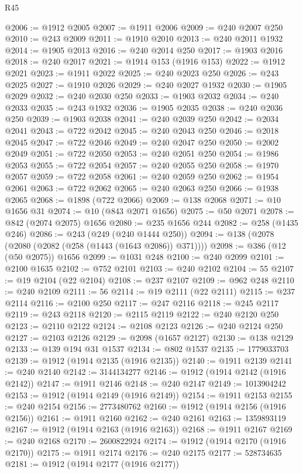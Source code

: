 \begin{lexlean}{R45}
\begin{coremodule}
{@2006 := @1912 @2005
@2007 := @1911 @2006
@2009 := @240 @2007 @250
@2010 := @243 @2009
@2011 := @1910 @2010
@2013 := @240 @2011 @1932
@2014 := @1905 @2013
@2016 := @240 @2014 @250
@2017 := @1903 @2016
@2018 := @240 @2017
@2021 := @1914 @153 (@1916 @153)
@2022 := @1912 @2021
@2023 := @1911 @2022
@2025 := @240 @2023 @250
@2026 := @243 @2025
@2027 := @1910 @2026
@2029 := @240 @2027 @1932
@2030 := @1905 @2029
@2032 := @240 @2030 @250
@2033 := @1903 @2032
@2034 := @240 @2033
@2035 := @243 @1932
@2036 := @1905 @2035
@2038 := @240 @2036 @250
@2039 := @1903 @2038
@2041 := @240 @2039 @250
@2042 := @2034 @2041
@2043 := @722 @2042
@2045 := @240 @2043 @250
@2046 := @2018 @2045
@2047 := @722 @2046
@2049 := @240 @2047 @250
@2050 := @2002 @2049
@2051 := @722 @2050
@2053 := @240 @2051 @250
@2054 := @1986 @2053
@2055 := @722 @2054
@2057 := @240 @2055 @250
@2058 := @1970 @2057
@2059 := @722 @2058
@2061 := @240 @2059 @250
@2062 := @1954 @2061
@2063 := @722 @2062
@2065 := @240 @2063 @250
@2066 := @1938 @2065
@2068 := @1898 (@722 @2066)
@2069 := @138 @2068
@2071 := @10 @1656 @31
@2074 := @10 (@843 @2071 @1656)
@2075 := @50 @2071
@2078 := @842 (@2074 @2075) @1656
@2080 := @235 @1656 @244
@2082 := @258 (@1435 @246)
@2086 := @243 (@249 (@240 @1444 @250))
@2094 := @138 (@2078 (@2080 (@2082 (@258 (@1443 (@1643 @2086)) @371))))
@2098 := @386 (@12 (@50 @2075)) @1656
@2099 := @1031 @248
@2100 := @240 @2099
@2101 := @2100 @1635
@2102 := @752 @2101
@2103 := @240 @2102
@2104 := 55
@2107 := @19 @2104 (@22 @2104)
@2108 := @237 @2107
@2109 := @962 @248
@2110 := @240 @2109
@2111 := 56
@2114 := @19 @2111 (@22 @2111)
@2115 := @237 @2114
@2116 := @2100 @250
@2117 := @247 @2116
@2118 := @245 @2117
@2119 := @243 @2118
@2120 := @2115 @2119
@2122 := @240 @2120 @250
@2123 := @2110 @2122
@2124 := @2108 @2123
@2126 := @240 @2124 @250
@2127 := @2103 @2126
@2129 := @2098 (@1657 @2127)
@2130 := @138 @2129
@2133 := @139 @194 @31 @1537
@2134 := @802 @1537
@2135 := 1779033703
@2139 := @1912 (@1914 @2135 (@1916 @2135))
@2140 := @1911 @2139
@2141 := @240 @2140
@2142 := 3144134277
@2146 := @1912 (@1914 @2142 (@1916 @2142))
@2147 := @1911 @2146
@2148 := @240 @2147
@2149 := 1013904242
@2153 := @1912 (@1914 @2149 (@1916 @2149))
@2154 := @1911 @2153
@2155 := @240 @2154
@2156 := 2773480762
@2160 := @1912 (@1914 @2156 (@1916 @2156))
@2161 := @1911 @2160
@2162 := @240 @2161
@2163 := 1359893119
@2167 := @1912 (@1914 @2163 (@1916 @2163))
@2168 := @1911 @2167
@2169 := @240 @2168
@2170 := 2600822924
@2174 := @1912 (@1914 @2170 (@1916 @2170))
@2175 := @1911 @2174
@2176 := @240 @2175
@2177 := 528734635
@2181 := @1912 (@1914 @2177 (@1916 @2177))
}
\end{coremodule}
\end{lexlean}
